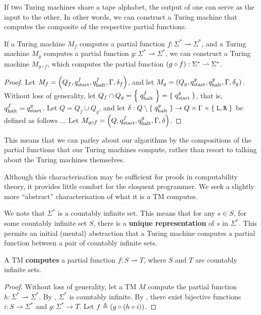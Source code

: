 If two Turing machines share a tape alphabet, the output of one can serve as
the input to the other. In other words, we can construct a Turing machine that
computes the composite of the respective partial functions.

\begin{theorem} If a Turing machine $M_f$ computes a partial function $f :
\Sigma^* \rightharpoonup \Sigma^*$, and a Turing machine $M_g$ computes a
partial function $g : \Sigma^* \rightharpoonup \Sigma^*$, we can construct a
Turing machine $M_{g \circ f}$, which computes the partial function $\mathopen{}\left({g \circ
f}\right)\mathclose{} : \Sigma^* \rightharpoonup \Sigma^*$. \end{theorem}

\begin{proof} Let $M_f=\mathopen{}\left({Q_f,q_{\text{start}}^f,q_{\text{halt}}^f,\Gamma,\delta_f}\right)\mathclose{}$, and let
$M_g=\mathopen{}\left({Q_g,q_{\text{start}}^g,q_{\text{halt}}^g,\Gamma,\delta_g}\right)\mathclose{}$. Without loss of generality,
let $Q_f \cap Q_g = \mathopen{}\left\{\mathrel{}{q_{\text{halt}}^f}\mathrel{}\right\}\mathclose{} = \mathopen{}\left\{\mathrel{}{q_{\text{start}}^g}\mathrel{}\right\}\mathclose{}$, that is,
$q_{\text{halt}}^f=q_{\text{start}}^g$. Let $Q=Q_f \cup Q_g$, and let $\delta : Q \setminus
\mathopen{}\left\{\mathrel{}{q_{\text{halt}}^g}\mathrel{}\right\}\mathclose{} \rightarrow Q \times \Gamma \times \mathopen{}\left\{\mathrel{}{\mathtt{L},\mathtt{R}}\mathrel{}\right\}\mathclose{}$ be
defined as follows ... Let $M_{g \circ f} = \mathopen{}\left({Q, q_{\text{start}}^f, q_{\text{halt}}^g, \Gamma,
\delta}\right)\mathclose{}$.\end{proof}

This means that we can parley about our algorithms by the compositions of the
partial functions that our Turing machines compute, rather than resort to
talking about the Turing machines themselves.

Although this characterisation may be sufficient for proofs in computability
theory, it provides little comfort for the eloquent programmer. We seek a
slightly more ``abstract'' characterisation of what it is a TM computes.

We note that $\Sigma^*$ is a countably infinite set. This means that for any $s
\in S$, for some countably infinite set $S$, there is a \textbf{unique
representation} of $s$ in $\Sigma^*$. This permits an initial (mental)
abstraction that a Turing machine computes a partial function between a pair of
countably infinite sets.

\begin{theorem} \label{thm:tm-countably-infinite} A TM \textbf{computes} a
partial function $f : S \rightharpoonup T$, where $S$ and $T$ are countably
infinite sets.  \end{theorem}

\begin{proof} Without loss of generality, let a TM $M$ compute the partial
function $h : \Sigma^* \rightharpoonup \Sigma^*$. By
, $\Sigma^*$ is countably infinite. By
, there exist bijective
functions $i : S \rightarrow \Sigma^*$ and $g : \Sigma^* \rightarrow T$.  Let
$f \triangleq \mathopen{}\left({g \circ \mathopen{}\left({h \circ i}\right)\mathclose{}}\right)\mathclose{}$.\end{proof}

